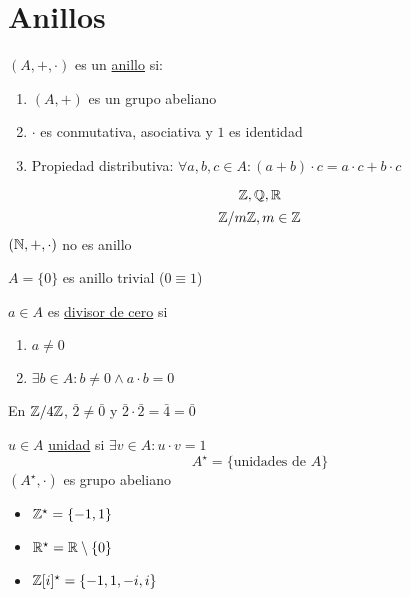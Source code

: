     \chapter{Anillos}
    \begin{defn}[Anillo]
        $(A,+,\cdot)$ es un \underline{anillo} si:
        \begin{enumerate}
            \item $(A,+)$ es un grupo abeliano

            \item $\cdot$ es conmutativa, asociativa y $1$ es identidad

            \item Propiedad distributiva: $\forall a,b,c\in A: (a+b)\cdot c=a\cdot c+ b\cdot c$
        \end{enumerate}
    \end{defn}

    \begin{ejm}
        \[\mathbb{Z},\mathbb{Q},\mathbb{R}\]
        \[\mathbb{Z}/m\mathbb{Z},m\in\mathbb{Z}\]
        $(\mathbb{N},+,\cdot)$ no es anillo
    \end{ejm}

    \begin{obs}
        $A=\{0\}$ es anillo trivial ($0\equiv 1$)
    \end{obs}

    \begin{defn}
        $a\in A$ es \underline{divisor de cero} si
        \begin{enumerate}
            \item $a\neq 0$

            \item $\exists b\in A: b\neq0 \wedge a\cdot b=0$
        \end{enumerate}
    \end{defn}

    \begin{ejm}
        En $\mathbb{Z}/4\mathbb{Z}$, $\bar{2}\neq\bar{0}$ y $\bar{2}\cdot\bar{2}=\bar{4}=\bar{0}$
    \end{ejm}

    \begin{defn}[Unidad]
        $u\in A$ \underline{unidad} si $\exists v\in A: u\cdot v=1$
        \[A^\star=\{\text{unidades de }A\}\]
        $(A^\star,\cdot)$ es grupo abeliano
    \end{defn}

    \begin{ejm}
        \hfill
        \begin{itemize}
            \item $\mathbb{Z}^\star=\{-1,1\}$

            \item $\mathbb{R}^\star=\mathbb{R}\setminus\{0\}$

            \item $\mathbb{Z}[i]^\star=\{-1,1,-i,i\}$
        \end{itemize}
    \end{ejm}

